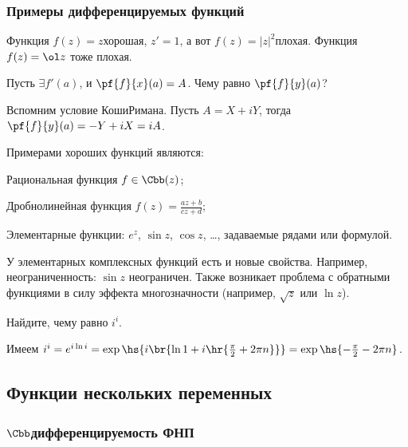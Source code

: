 \documentclass[a4paper]{article}
\begin{document}
\subsubsection{Примеры дифференцируемых функций}

Функция $f(z)=z$\т хорошая, $z'=1$, а вот $f(z) = |z|^2$\т плохая. Функция $f(z)=\ol z$ тоже плохая.

\begin{problem}
Пусть $\exi f'(a)$, и $\pf{f}{x}(a)=A$. Чему равно $\pf{f}{y}(a)$?
\end{problem}
\begin{solution}
Вспомним условие Коши\ч Римана. Пусть $A=X+iY$, тогда $\pf{f}{y}(a)=-Y+iX=iA$.
\end{solution}

Примерами хороших функций являются:

\begin{items}{-2}
\item Рациональная функция $f \in \Cbb(z)$;
\item Дробно\д линейная функция $f(z) = \frac{az+b}{cz+d}$;
\item Элементарные функции: $e^{z}$, $\sin z$, $\cos z$, \dots, задаваемые рядами или формулой.
\end{items}

\begin{note}
У элементарных комплексных функций есть и новые свойства. Например, неограниченность: $\sin z$ неограничен.
Также возникает проблема с обратными функциями в силу эффекта многозначности (например, $\sqrt{z}$ или $\ln z$).
\end{note}

\begin{problem}
Найдите, чему равно $i^i$.
\end{problem}
\begin{solution}
Имеем
$i^i = e^{i\ln i} = \exp\hs{i\br{\ln 1 + i\hr{\frac{\pi }{2} + 2\pi n}}} = \exp\hs{-\frac{\pi}{2}-2\pi n}$.
\end{solution}


\subsection{Функции нескольких переменных}

\subsubsection{$\Cbb$\д дифференцируемость ФНП}
\end{document}
